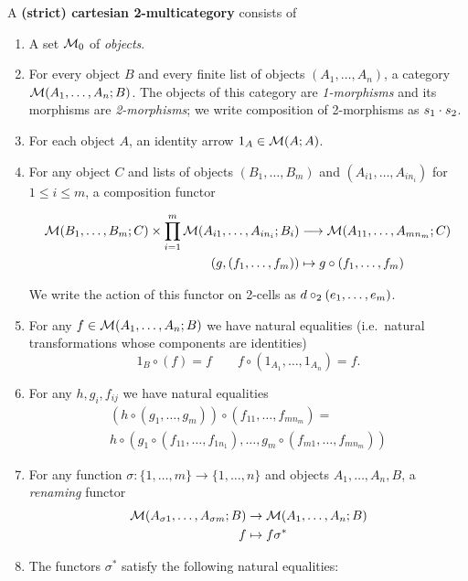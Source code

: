 \begin{definition}
  A \textbf{(strict) cartesian 2-multicategory} consists of
  \begin{enumerate}
  \item A set $\mathcal{M}_0$ of \emph{objects}.
  \item For every object $B$ and every finite list of objects $(A_1,\dots,A_n)$, a category $\mathcal{M}(A_1,\dots,A_n;B)$.
    The objects of this category are \emph{1-morphisms} and its morphisms are \emph{2-morphisms}; we write composition of 2-morphisms as $s_1 \cdot s_2$.
  \item For each object $A$, an identity arrow $1_A\in\mathcal{M}(A;A)$.
  \item For any object $C$ and lists of objects $(B_1,\dots,B_m)$ and $(A_{i1},\dots,A_{in_i})$ for $1\le i\le m$, a composition functor
    \begin{footnotesize}
    \begin{align*}
      \mathcal{M}(B_1,\dots,B_m;C) \times \prod_{i=1}^m \mathcal{M}(A_{i1},\dots,A_{in_i};B_i) &\longrightarrow \mathcal{M}(A_{11},\dots,A_{mn_m};C)\\
      (g,(f_1,\dots,f_m)) &\mapsto g\circ (f_1,\dots,f_m)
    \end{align*}
    \end{footnotesize}
    We write the action of this functor on 2-cells as $d \mathbin{\circ_2} (e_1,\dots,e_m)$.
   \item For any $f\in\mathcal{M}(A_1,\dots,A_n;B)$ we have natural equalities (i.e.\ natural transformations whose components are identities)
     \[
       1_B \circ (f) = f \qquad
       f\circ (1_{A_1},\dots,1_{A_n}) = f.
       \]
   \item For any $h,g_i,f_{ij}$ we have natural equalities
     \begin{multline*}
       (h\circ (g_1,\dots,g_m))\circ (f_{11},\dots,f_{mn_m}) =\\
       h \circ (g_1\circ (f_{11},\dots,f_{1n_1}), \dots, g_m \circ (f_{m1},\dots,f_{mn_m}))
     \end{multline*}
  \item For any function $\sigma : \{1,\dots,m\} \to \{1,\dots,n\}$ and
    objects $A_1,\dots,A_n,B$, a \emph{renaming} functor
    \begin{align*}
      \mathcal{M}(A_{\sigma 1},\dots,A_{\sigma m}; B) &\to \mathcal{M}(A_1,\dots,A_n;B)\\
      f &\mapsto f\sigma^*
    \end{align*}
   \item The functors $\sigma^*$ satisfy the following natural equalities:

\end{enumerate}
\end{definition}

